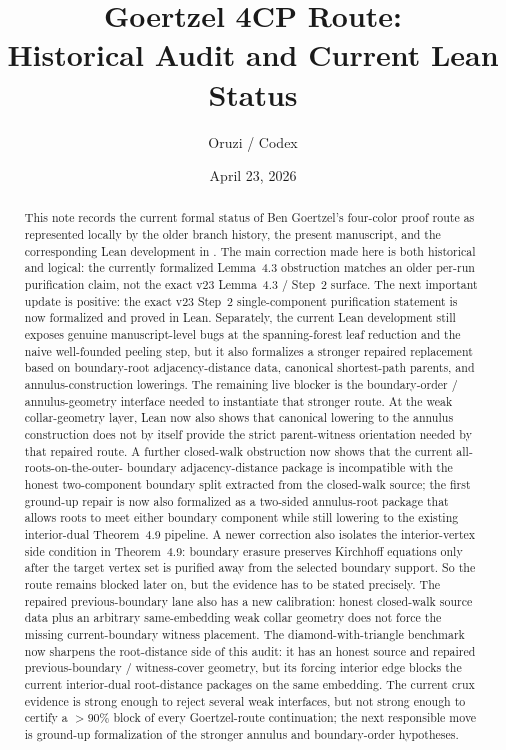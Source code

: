\documentclass[11pt]{article}
\title{Goertzel 4CP Route:\\Historical Audit and Current Lean Status}
\author{Oruzi / Codex}
\date{April 23, 2026}
\begin{document}
\maketitle
\sloppy

\begin{abstract}
This note records the current formal status of Ben Goertzel's four-color proof
route as represented locally by the older branch history, the present
 manuscript, and the corresponding Lean development in
.  The main correction made here is both
historical and logical: the currently formalized Lemma~4.3 obstruction matches
an older per-run purification claim, not the exact v23 Lemma~4.3 / Step~2
surface.  The next important update is positive: the exact v23 Step~2
single-component purification statement is now formalized and proved in Lean.
Separately, the current Lean development still exposes genuine manuscript-level
bugs at the spanning-forest leaf reduction and the naive well-founded peeling
step, but it also formalizes a stronger repaired replacement based on
boundary-root adjacency-distance data, canonical shortest-path parents, and
annulus-construction lowerings.  The remaining live blocker is the
boundary-order / annulus-geometry interface needed to instantiate that stronger
route.  At the weak collar-geometry layer, Lean now also shows that canonical
lowering to the annulus construction does not by itself provide the strict
parent-witness orientation needed by that repaired route.  A further
closed-walk obstruction now shows that the current all-roots-on-the-outer-
boundary adjacency-distance package is incompatible with the honest
two-component boundary split extracted from the closed-walk source; the first
ground-up repair is now also formalized as a two-sided annulus-root package
that allows roots to meet either boundary component while still lowering to
the existing interior-dual Theorem~4.9 pipeline.  A newer correction
also isolates the interior-vertex side condition in
Theorem~4.9: boundary erasure preserves Kirchhoff equations only after the
target vertex set is purified away from the selected boundary support.  So the
route remains blocked later on, but the evidence has to be stated precisely.
The repaired previous-boundary lane also has a new calibration: honest
closed-walk source data plus an arbitrary same-embedding weak collar geometry
does not force the missing current-boundary witness placement.
The diamond-with-triangle benchmark now sharpens the root-distance side of this
audit: it has an honest source and repaired previous-boundary / witness-cover
geometry, but its forcing interior edge blocks the current interior-dual
root-distance packages on the same embedding.
The current crux evidence is strong enough to reject several weak interfaces,
but not strong enough to certify a \(>90\%\) block of every Goertzel-route
continuation; the next responsible move is ground-up formalization of the
stronger annulus and boundary-order hypotheses.
\end{abstract}
\end{document}
